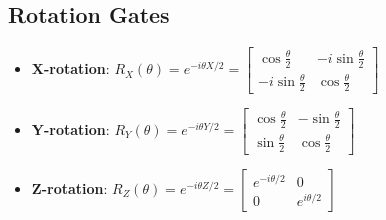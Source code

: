\begin{multicols}{3}
    \section*{Rotation Gates}
    \begin{itemize}[leftmargin=*,nosep,topsep=0pt]
      \item \textbf{X-rotation}: $R_X(\theta) = e^{-i\theta X/2} = \begin{bmatrix} \cos\frac{\theta}{2} & -i\sin\frac{\theta}{2} \\ -i\sin\frac{\theta}{2} & \cos\frac{\theta}{2} \end{bmatrix}$
      \item \textbf{Y-rotation}: $R_Y(\theta) = e^{-i\theta Y/2} = \begin{bmatrix} \cos\frac{\theta}{2} & -\sin\frac{\theta}{2} \\ \sin\frac{\theta}{2} & \cos\frac{\theta}{2} \end{bmatrix}$
      \item \textbf{Z-rotation}: $R_Z(\theta) = e^{-i\theta Z/2} = \begin{bmatrix} e^{-i\theta/2} & 0 \\ 0 & e^{i\theta/2} \end{bmatrix}$
    \end{itemize}


\end{multicols}
